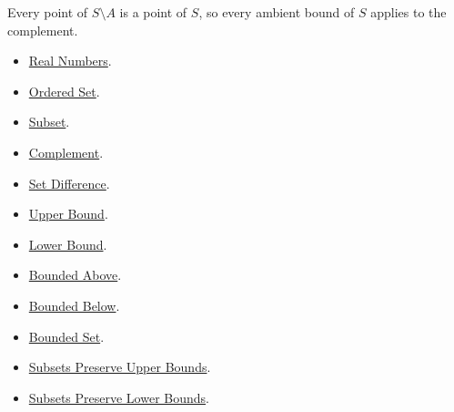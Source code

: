 \begin{remark*}[Interpretation]
Every point of $S\setminus A$ is a point of $S$, so every ambient bound of
$S$ applies to the complement.
\end{remark*}

\begin{dependencies}
\begin{itemize}
\item \hyperref[def:reals]{Real Numbers}.
\item \hyperref[def:ordered-set]{Ordered Set}.
\item \hyperref[def:subset]{Subset}.
\item \hyperref[def:complement]{Complement}.
\item \hyperref[def:set-difference]{Set Difference}.
\item \hyperref[def:real-upper-bound]{Upper Bound}.
\item \hyperref[def:real-lower-bound]{Lower Bound}.
\item \hyperref[def:bounded-above]{Bounded Above}.
\item \hyperref[def:bounded-below]{Bounded Below}.
\item \hyperref[def:bounded]{Bounded Set}.
\item \hyperref[lem:subsets-preserve-upper-bounds]{Subsets Preserve Upper Bounds}.
\item \hyperref[lem:subsets-preserve-lower-bounds]{Subsets Preserve Lower Bounds}.
\end{itemize}
\end{dependencies}

